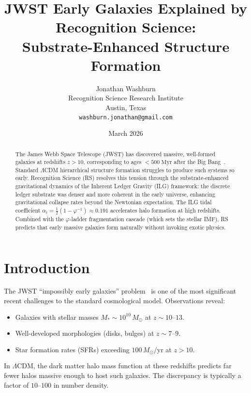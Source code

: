 \documentclass[12pt,a4paper]{article}
\title{JWST Early Galaxies Explained by Recognition Science:\\
Substrate-Enhanced Structure Formation}
\author{Jonathan Washburn\\
Recognition Science Research Institute\\
Austin, Texas\\
\texttt{washburn.jonathan@gmail.com}}
\date{March 2026}
\theoremstyle{definition}
\theoremstyle{remark}
\begin{document}
\maketitle

\begin{abstract}
The James Webb Space Telescope (JWST) has discovered massive,
well-formed galaxies at redshifts $z > 10$, corresponding to ages
$< 500\;\mathrm{Myr}$ after the Big Bang~\cite{Naidu2022,
Labbe2023}.  Standard $\Lambda$CDM hierarchical structure formation
struggles to produce such systems so early.  Recognition Science
(RS) resolves this tension through the substrate-enhanced
gravitational dynamics of the Inherent Ledger Gravity (ILG)
framework: the discrete ledger substrate was denser and more coherent
in the early universe, enhancing gravitational collapse rates beyond
the Newtonian expectation.  The ILG tidal coefficient
$\alpha_t = \tfrac{1}{2}(1 - \varphi^{-1}) \approx 0.191$
accelerates halo formation at high redshifts.  Combined with the
$\varphi$-ladder fragmentation cascade (which sets the stellar IMF),
RS predicts that early massive galaxies form naturally without
invoking exotic physics.
\end{abstract}

\section{Introduction}
\label{sec:intro}

The JWST ``impossibly early galaxies'' problem~\cite{Naidu2022,
Labbe2023, Finkelstein2023} is one of the most significant recent
challenges to the standard cosmological model.  Observations reveal:
\begin{itemize}
  \item Galaxies with stellar masses $M_* \sim 10^{10}\,M_\odot$
  at $z \sim 10$--$13$.
  \item Well-developed morphologies (disks, bulges) at
  $z \sim 7$--$9$.
  \item Star formation rates (SFRs) exceeding $100\,M_\odot/
  \mathrm{yr}$ at $z > 10$.
\end{itemize}

In $\Lambda$CDM, the dark matter halo mass function at these
redshifts predicts far fewer halos massive enough to host such
galaxies.  The discrepancy is typically a factor of $10$--$100$ in
number density.
\end{document}
